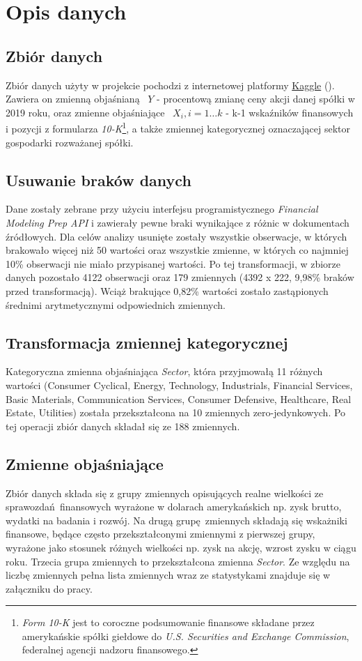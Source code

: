 \documentclass{article}
\begin{document}
\newpage
\section{Opis danych}

\subsection{Zbiór danych}
Zbiór danych użyty w projekcie pochodzi z internetowej platformy \href{https://www.kaggle.com/cnic92/200-financial-indicators-of-us-stocks-20142018}{Kaggle} (\textcite{Carbone2019}). Zawiera on zmienną objaśnianą ~$Y$ - procentową zmianę ceny akcji danej spółki w 2019 roku, oraz zmienne objaśniające ~$X_i,  i=1\dots k$ - k-1 wskaźników finansowych i pozycji z formularza \textit{10-K}\footnote{\textit{Form 10-K} jest to coroczne podsumowanie finansowe składane przez amerykańskie spółki giełdowe do \textit{U.S. Securities and Exchange Commission}, federalnej agencji nadzoru finansowego.}, a także zmiennej kategorycznej oznaczającej sektor gospodarki rozważanej spółki.

\subsection{Usuwanie braków danych}
Dane zostały zebrane przy użyciu interfejsu programistycznego \textit{Financial Modeling Prep API} i zawierały pewne braki wynikające z różnic w dokumentach źródłowych. Dla celów analizy usunięte zostały wszystkie obserwacje, w których brakowało więcej niż 50 wartości oraz wszystkie zmienne, w których co najmniej 10\% obserwacji nie miało przypisanej wartości. Po tej transformacji, w zbiorze danych pozostało 4122 obserwacji oraz 179 zmiennych (4392 x 222, 9,98\% braków przed transformacją). Wciąż brakujące 0,82\% wartości zostało zastąpionych średnimi arytmetycznymi odpowiednich zmiennych.

\subsection{Transformacja zmiennej kategorycznej}
Kategoryczna zmienna objaśniająca \textit{Sector}, która przyjmowałą 11 różnych wartości (Consumer Cyclical, Energy, Technology, Industrials, Financial Services, Basic Materials, Communication Services, Consumer Defensive, Healthcare, Real Estate, Utilities) została przekształcona na 10 zmiennych zero-jedynkowych. Po tej operacji zbiór danych składał się ze 188 zmiennych.

\subsection{Zmienne objaśniające}
Zbiór danych składa się z grupy zmiennych opisujących realne wielkości ze sprawozdań finansowych wyrażone w dolarach amerykańskich np. zysk brutto, wydatki na badania i rozwój. Na drugą grupę zmiennych składają się wskażniki finansowe, będące często przekształconymi zmiennymi z pierwszej grupy, wyrażone jako stosunek różnych wielkości np. zysk na akcję, wzrost zysku w ciągu roku. Trzecia grupa zmiennych to przekształcona zmienna \textit{Sector}. Ze względu na liczbę zmiennych pełna lista zmiennych wraz ze statystykami znajduje się w załączniku do pracy.
\end{document}
